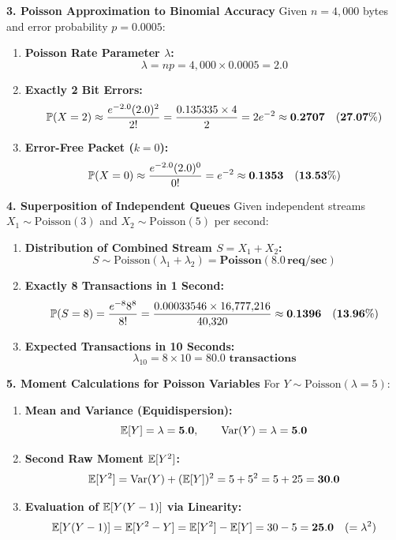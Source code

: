 \textbf{3. Poisson Approximation to Binomial Accuracy}
Given $n = 4{,}000$ bytes and error probability $p = 0.0005$:
\begin{enumerate}
    \item \textbf{Poisson Rate Parameter $\lambda$:}
    $$\lambda = np = 4{,}000 \times 0.0005 = \mathbf{2.0}$$
    \item \textbf{Exactly 2 Bit Errors:}
    $$\P(X = 2) \approx \frac{e^{-2.0} (2.0)^2}{2!} = \frac{0.135335 \times 4}{2} = 2 e^{-2} \approx \mathbf{0.2707 \quad (27.07\%)}$$
    \item \textbf{Error-Free Packet ($k = 0$):}
    $$\P(X = 0) \approx \frac{e^{-2.0} (2.0)^0}{0!} = e^{-2} \approx \mathbf{0.1353 \quad (13.53\%)}$$
\end{enumerate}

\textbf{4. Superposition of Independent Queues}
Given independent streams $X_1 \sim \text{Poisson}(3)$ and $X_2 \sim \text{Poisson}(5)$ per second:
\begin{enumerate}
    \item \textbf{Distribution of Combined Stream $S = X_1 + X_2$:}
    $$S \sim \text{Poisson}(\lambda_1 + \lambda_2) = \mathbf{\text{Poisson}(8.0\,\text{req/sec})}$$
    \item \textbf{Exactly 8 Transactions in 1 Second:}
    $$\P(S = 8) = \frac{e^{-8} 8^8}{8!} = \frac{0.00033546 \times 16{,}777{,}216}{40{,}320} \approx \mathbf{0.1396 \quad (13.96\%)}$$
    \item \textbf{Expected Transactions in 10 Seconds:}
    $$\lambda_{10} = 8 \times 10 = \mathbf{80.0 \text{ transactions}}$$
\end{enumerate}

\textbf{5. Moment Calculations for Poisson Variables}
For $Y \sim \text{Poisson}(\lambda = 5)$:
\begin{enumerate}
    \item \textbf{Mean and Variance (Equidispersion):}
    $$\E[Y] = \lambda = \mathbf{5.0}, \qquad \Var(Y) = \lambda = \mathbf{5.0}$$
    \item \textbf{Second Raw Moment $\E[Y^2]$:}
    $$\E[Y^2] = \Var(Y) + (\E[Y])^2 = 5 + 5^2 = 5 + 25 = \mathbf{30.0}$$
    \item \textbf{Evaluation of $\E[Y(Y - 1)]$ via Linearity:}
    $$\E[Y(Y - 1)] = \E[Y^2 - Y] = \E[Y^2] - \E[Y] = 30 - 5 = \mathbf{25.0} \quad (=\lambda^2)$$
\end{enumerate}

